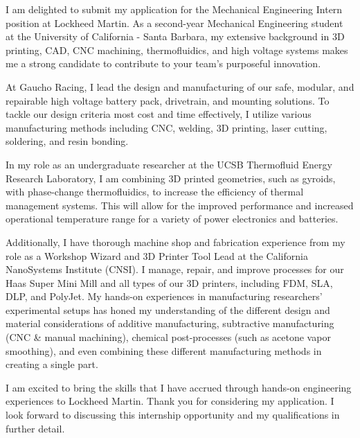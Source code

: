 \documentclass[11pt, letterpaper]{awesome-cv} %
\begin{document}
\makecvheader %

\makelettertitle %


\begin{cvletter}


I am delighted to submit my application for the Mechanical Engineering Intern position at Lockheed Martin. As a second-year Mechanical Engineering student at the University of California - Santa Barbara, my extensive background in 3D printing, CAD, CNC machining, thermofluidics, and high voltage systems makes me a strong candidate to contribute to your team's purposeful innovation.

At Gaucho Racing, I lead the design and manufacturing of our safe, modular, and repairable high voltage battery pack, drivetrain, and mounting solutions. To tackle our design criteria most cost and time effectively, I utilize various manufacturing methods including CNC, welding, 3D printing, laser cutting, soldering, and resin bonding. 

In my role as an undergraduate researcher at the UCSB Thermofluid Energy Research Laboratory, I am combining 3D printed geometries, such as gyroids, with phase-change thermofluidics, to increase the efficiency of thermal management systems. This will allow for the improved performance and increased operational temperature range for a variety of power electronics and batteries.

Additionally, I have thorough machine shop and fabrication experience from my role as a Workshop Wizard and 3D Printer Tool Lead at the California NanoSystems Institute (CNSI). I manage, repair, and improve processes for our Haas Super Mini Mill and all types of our 3D printers, including FDM, SLA, DLP, and PolyJet. My hands-on experiences in manufacturing researchers' experimental setups has honed my understanding of the different design and material considerations of additive manufacturing, subtractive manufacturing (CNC \& manual machining), chemical post-processes (such as acetone vapor smoothing), and even combining these different manufacturing methods in creating a single part.

I am excited to bring the skills that I have accrued through hands-on engineering experiences to Lockheed Martin. Thank you for considering my application. I look forward to discussing this internship opportunity and my qualifications in further detail.


\end{cvletter}


\makeletterclosing %
\end{document}
